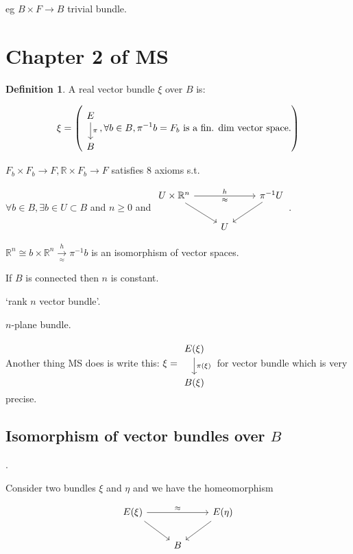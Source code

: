 \documentclass{article}
\theoremstyle{definition}
\newtheorem*{definition}{Definition}
\begin{document}
    eg \(B \times F \to B\) trivial bundle.

    \section*{Chapter 2 of MS}

    \begin{definition}
        A real vector bundle \(\xi\) over \(B\) is:

        \[
            \xi = \left( \begin{tikzcd} E \ar[d,"\pi"] \\ B \end{tikzcd}, \forall b\in B, \pi ^{-1} b = F_b \text{ is a fin. dim vector space.} \right) 
        \]

        \(F_b \times F_b \to F, \mathbb{R} \times F_b \to F\) satisfies \(8\) axioms s.t.

        \(\forall b\in B, \exists b\in U \subset B\) and \(n\geq 0\) and \(\begin{tikzcd}U \times \mathbb{R}^n \ar[rr,"h","\approx"'] \ar[rd] && \pi ^{-1} U \ar[ld] \\ & U\end{tikzcd}\).
    
        \(\mathbb{R}^n \cong b \times \mathbb{R}^n \xrightarrow[\approx]{h} \pi ^{-1} b\) is an isomorphism of vector spaces.
    \end{definition}

    If \(B\) is connected then \(n\) is constant.

    `rank \(n\) vector bundle'.

    \(n\)-plane bundle.

    Another thing MS does is write this: \(\xi = \begin{tikzcd} E(\xi) \ar[d,"\pi(\xi)"] \\ B(\xi)\end{tikzcd}\) for vector bundle which is very precise.

    \subsection*{Isomorphism of vector bundles over \(B\)}.

    Consider two bundles \(\xi\) and \(\eta\) and we have the homeomorphism

    \[
        \begin{tikzcd}
            E(\xi) \ar[rr, "\approx"] \ar[rd] && E(\eta) \ar[ld] \\ & B
        \end{tikzcd}
    \]
\end{document}
